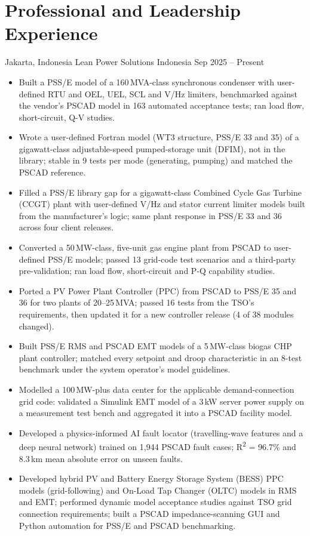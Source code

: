 \section*{Professional and Leadership Experience}
{Jakarta, Indonesia}
{Lean Power Solutions Indonesia}
{Sep 2025 -- Present}
{
\begin{itemize}
    \itemsep0em
    \item Built a PSS/E model of a 160\,MVA-class synchronous condenser with user-defined RTU and OEL, UEL, SCL and V/Hz limiters, benchmarked against the vendor's PSCAD model in 163 automated acceptance tests; ran load flow, short-circuit, Q-V studies.
    \item Wrote a user-defined Fortran model (WT3 structure, PSS/E 33 and 35) of a gigawatt-class adjustable-speed pumped-storage unit (DFIM), not in the library; stable in 9 tests per mode (generating, pumping) and matched the PSCAD reference.
    \item Filled a PSS/E library gap for a gigawatt-class Combined Cycle Gas Turbine (CCGT) plant with user-defined V/Hz and stator current limiter models built from the manufacturer's logic; same plant response in PSS/E 33 and 36 across four client releases.
    \item Converted a 50\,MW-class, five-unit gas engine plant from PSCAD to user-defined PSS/E models; passed 13 grid-code test scenarios and a third-party pre-validation; ran load flow, short-circuit and P-Q capability studies.
    \item Ported a PV Power Plant Controller (PPC) from PSCAD to PSS/E 35 and 36 for two plants of 20--25\,MVA; passed 16 tests from the TSO's requirements, then updated it for a new controller release (4 of 38 modules changed).
    \item Built PSS/E RMS and PSCAD EMT models of a 5\,MW-class biogas CHP plant controller; matched every setpoint and droop characteristic in an 8-test benchmark under the system operator's model guidelines.
    \item Modelled a 100\,MW-plus data center for the applicable demand-connection grid code: validated a Simulink EMT model of a 3\,kW server power supply on a measurement test bench and aggregated it into a PSCAD facility model.
    \item Developed a physics-informed AI fault locator (travelling-wave features and a deep neural network) trained on 1,944 PSCAD fault cases; R\textsuperscript{2} = 96.7\% and 8.3\,km mean absolute error on unseen faults.
    \item Developed hybrid PV and Battery Energy Storage System (BESS) PPC models (grid-following) and On-Load Tap Changer (OLTC) models in RMS and EMT; performed dynamic model acceptance studies against TSO grid connection requirements; built a PSCAD impedance-scanning GUI and Python automation for PSS/E and PSCAD benchmarking.
\end{itemize}
}

